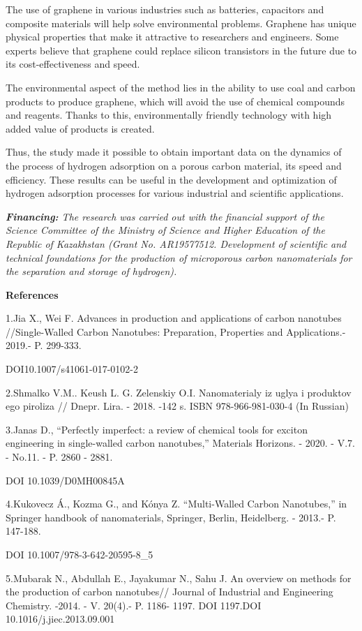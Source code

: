 The use of graphene in various industries such as batteries, capacitors
and composite materials will help solve environmental problems. Graphene
has unique physical properties that make it attractive to researchers
and engineers. Some experts believe that graphene could replace silicon
transistors in the future due to its cost-effectiveness and speed.

The environmental aspect of the method lies in the ability to use coal
and carbon products to produce graphene, which will avoid the use of
chemical compounds and reagents. Thanks to this, environmentally
friendly technology with high added value of products is created.

Thus, the study made it possible to obtain important data on the
dynamics of the process of hydrogen adsorption on a porous carbon
material, its speed and efficiency. These results can be useful in the
development and optimization of hydrogen adsorption processes for
various industrial and scientific applications.

\emph{{\bfseries Financing:} The research was carried out with the
financial support of the Science Committee of the Ministry of Science
and Higher Education of the Republic of Kazakhstan (Grant No.
AR19577512. Development of scientific and technical foundations for the
production of microporous carbon nanomaterials for the separation and
storage of hydrogen).}

{\bfseries References}

1.Jia X., Wei F. Advances in production and applications of carbon
nanotubes //Single-Walled Carbon Nanotubes: Preparation, Properties and
Applications.- 2019.- P. 299-333.

DOI10.1007/s41061-017-0102-2

2.Shmalko V.M.. Keush L. G. Zelenskiy O.I. Nanomaterialy iz uglya i
produktov ego piroliza // Dnepr. Lira. - 2018. -142 s. ISBN
978-966-981-030-4 (In Russian)

3.Janas D., ``Perfectly imperfect: a review of chemical tools for
exciton engineering in single-walled carbon nanotubes,'' Materials
Horizons. - 2020. - V.7. - No.11. - P. 2860 - 2881.

DOI 10.1039/D0MH00845A

4.Kukovecz Á., Kozma G., and Kónya Z. ``Multi-Walled Carbon Nanotubes,''
in Springer handbook of nanomaterials, Springer, Berlin, Heidelberg. -
2013.- P. 147-188.

DOI 10.1007/978-3-642-20595-8\_5

5.Mubarak N., Abdullah E., Jayakumar N., Sahu J. An overview on methods
for the production of carbon nanotubes// Journal of Industrial and
Engineering Chemistry. -2014. - V. 20(4).- P. 1186- 1197. DOI 1197.DOI
10.1016/j.jiec.2013.09.001

